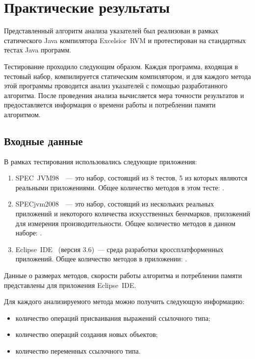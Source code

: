 \documentclass[14pt,titlepage]{extarticle}
\newcommand{\num}[1]{\numprint{#1}}
\newcommand{\eng}[1]{{\English#1}}
\let\oldsection\section
\renewcommand{\section}{\newpage\oldsection}
\newcommand{\java}{\eng{Java}\xspace}
\begin{document}
  \section{Практические результаты}

    Представленный алгоритм анализа указателей был реализован в рамках
    статического \java компилятора \eng{Excelsior~RVM} и протестирован на
    стандартных тестах \java программ.

    Тестирование проходило следующим образом. Каждая программа, входящая в
    тестовый набор, компилируется статическим компилятором, и для каждого
    метода этой программы проводится анализ указателей с помощью разработанного
    алгоритма.
    После проведения анализа вычисляется мера точности результатов и
    предоставляется информация о времени работы и потреблении памяти
    алгоритмом.

    \subsection{Входные данные}

      В рамках тестирования использовались следующие приложения:
      \begin{enumerate}
        \item \eng{SPEC~JVM98}~\cite{spec_jvm98}~--- это набор, состоящий из 8
              тестов, 5 из которых являются реальными приложениями. Общее
              количество методов в этом тесте: \num{3701}.
        \item \eng{SPECjvm2008}~\cite{spec_jvm2008}~--- это набор, состоящий из
              нескольких реальных приложений и некоторого количества
              искусственных бенчмарков, приложений для измерения
              производительности.
              Общее количество методов в данном наборе: \num{37931}.
        \item \eng{Eclipse~IDE}~\cite{eclipse} (версия 3.6)~--- среда
              разработки кроссплатформенных приложений.
              Общее количество методов в приложении: \num{263802}.
      \end{enumerate}
      Данные о размерах методов, скорости работы алгоритма и потреблении памяти
      представлены для приложения \eng{Eclipse~IDE}.

      Для каждого анализируемого метода можно получить следующую информацию:
      \begin{itemize}
        \item количество операций присваивания выражений ссылочного типа;
        \item количество операций создания новых объектов;
        \item количество переменных ссылочного типа.
      \end{itemize}
\end{document}
